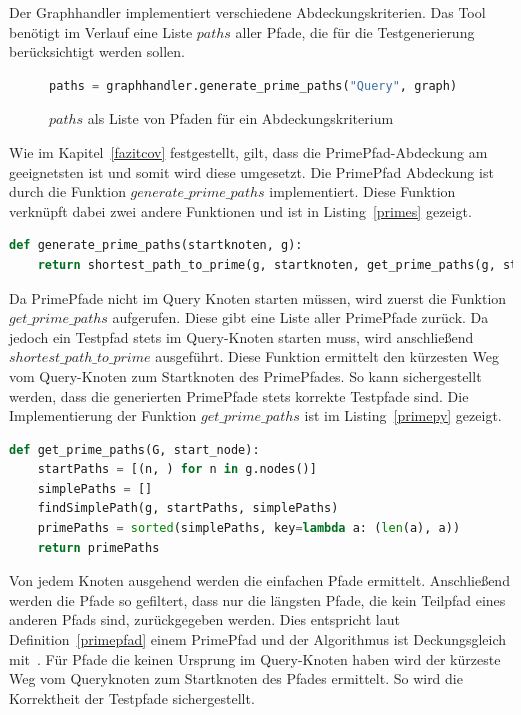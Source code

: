 Der Graphhandler implementiert verschiedene Abdeckungskriterien.
Das Tool benötigt im Verlauf eine Liste $paths$ aller Pfade, die für die Testgenerierung berücksichtigt werden sollen.

\begin{figure}[H]
    \begin{lstlisting}[language=Python]
paths = graphhandler.generate_prime_paths("Query", graph)
    \end{lstlisting}
    \caption{$paths$ als Liste von Pfaden für ein Abdeckungskriterium}
\end{figure}

Wie im Kapitel~\ref{fazitcov} festgestellt, gilt, dass die PrimePfad-Abdeckung am geeignetsten ist und somit wird diese umgesetzt.
Die PrimePfad Abdeckung ist durch die Funktion $generate\_prime\_paths$ implementiert.
Diese Funktion verknüpft dabei zwei andere Funktionen und ist in Listing~\ref{primes} gezeigt.

\begin{lstlisting}[language=Python,caption={valide PrimePfad Generierung}, label={primes}]
def generate_prime_paths(startknoten, g):
    return shortest_path_to_prime(g, startknoten, get_prime_paths(g, startknoten))
\end{lstlisting}

Da PrimePfade nicht im Query Knoten starten müssen, wird zuerst die Funktion $get\_prime\_paths$ aufgerufen.
Diese gibt eine Liste aller PrimePfade zurück.
Da jedoch ein Testpfad stets im Query-Knoten starten muss, wird anschließend $shortest\_path\_to\_prime$ ausgeführt.
Diese Funktion ermittelt den kürzesten Weg vom Query-Knoten zum Startknoten des PrimePfades.
So kann sichergestellt werden, dass die generierten PrimePfade stets korrekte Testpfade sind.
Die Implementierung der Funktion $get\_prime\_paths$ ist im Listing~\ref{primepy} gezeigt.

\begin{lstlisting}[language=Python, caption={PrimePfad Algorithmus}, label={primepy}]
def get_prime_paths(G, start_node):
    startPaths = [(n, ) for n in g.nodes()]
    simplePaths = []
    findSimplePath(g, startPaths, simplePaths)
    primePaths = sorted(simplePaths, key=lambda a: (len(a), a))
    return primePaths
\end{lstlisting}

Von jedem Knoten ausgehend werden die einfachen Pfade ermittelt.
Anschließend werden die Pfade so gefiltert, dass nur die längsten Pfade, die kein Teilpfad eines anderen Pfads sind, zurückgegeben werden.
Dies entspricht laut Definition~\ref{primepfad} einem PrimePfad und der Algorithmus ist Deckungsgleich mit~\cite[Finding Prime Test Paths S. 39]{software-testing}.
Für Pfade die keinen Ursprung im Query-Knoten haben wird der kürzeste Weg vom Queryknoten zum Startknoten des Pfades ermittelt.
So wird die Korrektheit der Testpfade sichergestellt.

